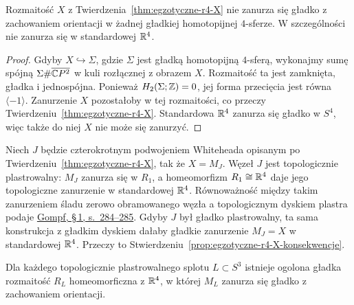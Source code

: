 \begin{stwierdzenie}
\label{prop:egzotyczne-r4-X-konsekwencje}
Rozmaitość $X$ z
Twierdzenia~\ref{thm:egzotyczne-r4-X} nie zanurza
się gładko z zachowaniem orientacji w żadnej
gładkiej homotopijnej $4$-sferze. W szczególności
nie zanurza się w standardowej $\mathbb{R}^4$.
\end{stwierdzenie}
\begin{proof}
Gdyby $X\hookrightarrow\Sigma$, gdzie $\Sigma$
jest gładką homotopijną $4$-sferą, wykonajmy
sumę spójną $\Sigma\#\overline{\mathbb{C} P^2}$
w kuli rozłącznej z obrazem $X$. Rozmaitość
ta jest zamknięta, gładka i jednospójna.
Ponieważ $H_2(\Sigma;\mathbb{Z})=0$, jej forma przecięcia
jest równa $\langle-1\rangle$. Zanurzenie $X$
pozostałoby w tej rozmaitości, co przeczy
Twierdzeniu~\ref{thm:egzotyczne-r4-X}.
Standardowa $\mathbb{R}^4$ zanurza się gładko w $S^4$,
więc także do niej $X$ nie może się zanurzyć.
\end{proof}

\begin{przyklad}
\label{prz:egzotyczne-r4-J}
Niech $J$ będzie czterokrotnym podwojeniem
Whiteheada opisanym po
Twierdzeniu~\ref{thm:egzotyczne-r4-X}, tak że
$X=M_J$. Węzeł $J$ jest topologicznie
plastrowalny: $M_J$ zanurza się w $R_1$,
a homeomorfizm $R_1\cong\mathbb{R}^4$ daje jego
topologiczne zanurzenie w standardowej $\mathbb{R}^4$.
Równoważność między takim zanurzeniem śladu
zerowo obramowanego węzła a topologicznym
dyskiem plastra podaje
\href{https://doi.org/10.4310/jdg/1214439566}
{Gompf, \S\,1, s.~284--285}.
Gdyby $J$ był gładko plastrowalny, ta sama
konstrukcja z gładkim dyskiem dałaby gładkie
zanurzenie $M_J=X$ w standardowej $\mathbb{R}^4$.
Przeczy to
Stwierdzeniu~\ref{prop:egzotyczne-r4-X-konsekwencje}.
\end{przyklad}

\begin{twierdzenie}
\label{thm:egzotyczne-r4-slad}
Dla każdego topologicznie plastrowalnego splotu
$L\subset S^3$ istnieje ogolona gładka
rozmaitość $R_L$ homeomorficzna z $\mathbb{R}^4$,
w której $M_L$ zanurza się gładko z zachowaniem
orientacji.
\end{twierdzenie}

